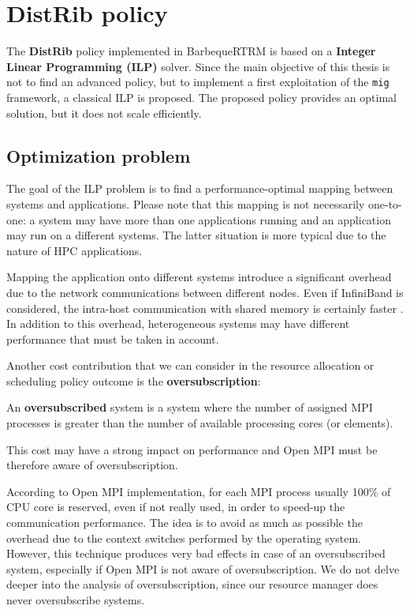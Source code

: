 \section{DistRib policy}
\label{sec:distribpolicy}
The \textbf{DistRib} policy implemented in BarbequeRTRM is based on a
\textbf{Integer Linear Programming (ILP)} solver. Since the main objective of
this thesis is not to find an advanced policy, but to implement a first exploitation of the \texttt{mig} framework, a classical ILP is proposed.
The proposed policy provides an optimal solution, but it does not scale efficiently.

\subsection{Optimization problem}
The goal of the ILP problem is to find a performance-optimal mapping between
systems and
applications. Please note that this mapping is not necessarily one-to-one: a 
system may have more than one applications running and an application may run
on a different systems. The latter situation is more typical due to the nature
of HPC applications.

Mapping the application onto different systems introduce a significant
overhead due to the network communications between different nodes. Even if
InfiniBand is considered, the intra-host communication with shared memory is
certainly faster \cite{graham2005open}.
In addition to this overhead, heterogeneous systems may
have different performance that must be taken in account. 

Another cost contribution that we can consider in the resource allocation or scheduling policy outcome is the \textbf{oversubscription}:

\begin{PolicyDef}
   An \textbf{oversubscribed} system is a system where the number of
   assigned MPI processes is greater than the number of available processing
   cores (or elements).  
\end{PolicyDef}

This cost may have a strong impact on performance and Open MPI must be therefore aware of oversubscription.

According to Open MPI implementation, for each MPI
process usually
100\% of CPU core is reserved, even if not really used, in order to speed-up the communication
performance. The idea is to avoid as much as possible the overhead due 
to the context switches performed by the operating system. However, this technique produces very bad effects in case of
an oversubscribed system, especially if Open MPI is not aware of oversubscription. We do not delve deeper into the analysis of
oversubscription, since our resource manager does never oversubscribe systems.

